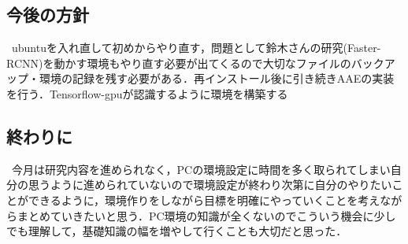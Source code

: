 \documentclass[11pt,a4j,ascmac]{jarticle}
\begin{document}
\subsection{今後の方針}
\  ubuntuを入れ直して初めからやり直す，問題として鈴木さんの研究(Faster-RCNN)を動かす環境もやり直す必要が出てくるので大切なファイルのバックアップ・環境の記録を残す必要がある．再インストール後に引き続きAAEの実装を行う．Tensorflow-gpuが認識するように環境を構築する


\subsection{終わりに}
\  今月は研究内容を進められなく，PCの環境設定に時間を多く取られてしまい自分の思うように進められていないので環境設定が終わり次第に自分のやりたいことができるように，環境作りをしながら目標を明確にやっていくことを考えながらまとめていきたいと思う．PC環境の知識が全くないのでこういう機会に少しでも理解して，基礎知識の幅を増やして行くことも大切だと思った．

\footnotesize



\normalsize
\end{document}
